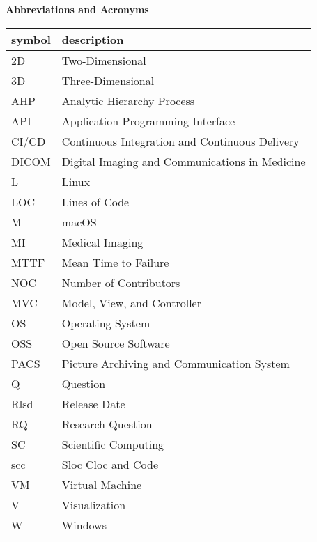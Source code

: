 \begin{center}
\textbf{\large Abbreviations and Acronyms}
\end{center}

\begin{table}[H]
\centering
\begin{tabular}{ll} 
\hline
\textbf{symbol} & \textbf{description}\\
\hline		
2D & Two-Dimensional\\
3D & Three-Dimensional\\
AHP & Analytic Hierarchy Process\\
API & Application Programming Interface\\
CI/CD & Continuous Integration and Continuous Delivery\\
DICOM & Digital Imaging and Communications in Medicine \\
L & Linux \\
LOC & Lines of Code\\
M & macOS\\
MI & Medical Imaging\\
MTTF & Mean Time to Failure\\
NOC &  Number of Contributors\\
MVC & Model, View, and Controller\\
OS & Operating System\\
OSS & Open Source Software\\
PACS & Picture Archiving and Communication System\\
Q & Question\\
Rlsd & Release Date\\
RQ & Research Question\\
SC & Scientific Computing\\
scc & Sloc Cloc and Code\\
VM & Virtual Machine\\
V & Visualization\\
W & Windows\\
\hline		
\end{tabular}\\
\end{table}
